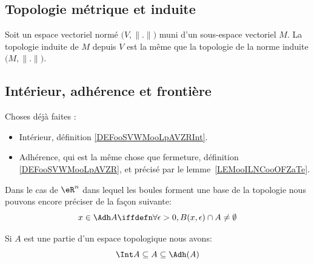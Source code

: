 \subsection{Topologie métrique et induite}

\begin{lemma}       \label{LEMooKDMYooMIcFRI}
	Soit un espace vectoriel normé \( \big( V,\| . \| \big)   \) muni d'un sous-espace vectoriel \( M\). La topologie induite de \( M\) depuis \( V\) est la même que la topologie de la norme induite \( \big( M,\| . \| \big)\).
\end{lemma}

\subsection{Intérieur, adhérence et frontière}

\begin{normaltext}
	Choses déjà faites :
	\begin{itemize}
		\item
		      Intérieur, définition \ref{DEFooSVWMooLpAVZRInt}.
		\item
		      Adhérence, qui est la même chose que fermeture, définition \ref{DEFooSVWMooLpAVZR}, et précisé par le lemme~\ref{LEMooILNCooOFZaTe}.
	\end{itemize}

	Dans le cas de \( \eR^n\) dans lequel les boules forment une base de la topologie nous pouvons encore préciser de la façon suivante:
	\begin{equation}
		x \in \Adh A \iffdefn \forall \epsilon > 0, B(x,\epsilon) \cap A \neq \emptyset
	\end{equation}
\end{normaltext}

\begin{proposition}		\label{PROPooZRFZooVqDFWD}
	Si \( A\) est une partie d'un espace topologique nous avons:
	\begin{equation}
		\Int A \subseteq A  \subseteq \Adh(A)
	\end{equation}
\end{proposition}

